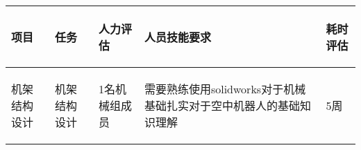 
\begin{longtable}{ p{2cm} | p{3cm} | p{3cm} | p{4.8cm} | p{2cm} |}

    \hline

    \endfoot
    
    \rowcolor{tabhdcolor}

        \begin{center}
            项目
        \end{center}  &
        \begin{center}
            任务
        \end{center}  &
        \begin{center}
           人力评估
        \end{center} &
        \begin{center}
            人员技能要求
        \end{center}  &
        \begin{center}
            耗时评估
        \end{center}  \\ 
        
    \hline

    \endhead

        \begin{center}
            机架结构设计
        \end{center} &
        \begin{center}
            机架结构设计
        \end{center} &
        \begin{center}
            1名机械组成员
        \end{center} &
        \begin{center}
            需要熟练使用solidworks对于机械基础扎实对于空中机器人的基础知识理解
        \end{center} &
        \begin{center}
            5周
        \end{center}\\
        

\end{longtable}
